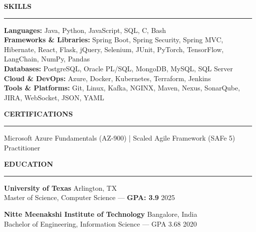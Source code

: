 \documentclass[10pt]{article}
\newcommand{\sectionTitle}[1]{\vspace{1pt}\noindent\textbf{\small #1}\vspace{0.5pt}\hrule\vspace{1pt}}
\begin{document}
\sectionTitle{SKILLS}

\textbf{Languages:} Java, Python, JavaScript, SQL, C, Bash \\
\textbf{Frameworks \& Libraries:} Spring Boot, Spring Security, Spring MVC, Hibernate, React, Flask, jQuery, Selenium, JUnit, PyTorch, TensorFlow, LangChain, NumPy, Pandas \\
\textbf{Databases:} PostgreSQL, Oracle PL/SQL, MongoDB, MySQL, SQL Server \\
\textbf{Cloud \& DevOps:} Azure, Docker, Kubernetes, Terraform, Jenkins \\
\textbf{Tools \& Platforms:} Git, Linux, Kafka, NGINX, Maven, Nexus, SonarQube, JIRA, WebSocket, JSON, YAML

\sectionTitle{CERTIFICATIONS}

Microsoft Azure Fundamentals (AZ-900) \;|\; Scaled Agile Framework (SAFe 5) Practitioner

\sectionTitle{EDUCATION}

\textbf{University of Texas} \hfill Arlington, TX \\
Master of Science, Computer Science — \textbf{GPA: 3.9} \hfill 2025

\textbf{Nitte Meenakshi Institute of Technology} \hfill Bangalore, India \\
Bachelor of Engineering, Information Science — GPA 3.68 \hfill 2020
\end{document}
